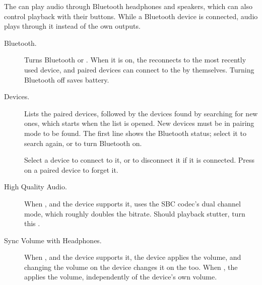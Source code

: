 The \dap{} can play audio through Bluetooth headphones and speakers, which can
also control playback with their buttons. While a Bluetooth device is
connected, audio plays through it instead of the \daps{} own outputs.

\begin{description}
  \item[Bluetooth.] Turns Bluetooth  or . When it is
    on, the \dap{} reconnects to the most recently used device, and paired
    devices can connect to the \dap{} by themselves. Turning Bluetooth off
    saves battery.
  \item[Devices.] Lists the paired devices, followed by the devices found by
    searching for new ones, which starts when the list is opened. New devices
    must be in pairing mode to be found. The first line shows the Bluetooth
    status; select it to search again, or to turn Bluetooth on.

    Select a device to connect to it, or to disconnect it if it is connected.
    Press \ActionStdContext{} on a paired device to forget it.
  \item[High Quality Audio.] When , and the device supports it,
    uses the SBC codec's dual channel mode, which roughly doubles the bitrate.
    Should playback stutter, turn this .
  \item[Sync Volume with Headphones.] When , and the device
    supports it, the device applies the volume, and changing the volume on the
    device changes it on the \dap{} too. When , the \dap{} applies
    the volume, independently of the device's own volume.
\end{description}

